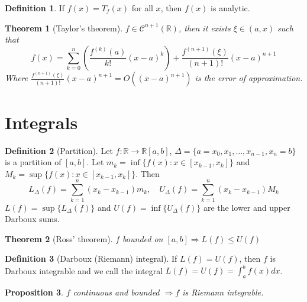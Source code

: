 \documentclass{article}
\newcommand{\Ar}{\Rightarrow}
\newcommand{\fOnR}[1]{#1 : \mathbb{R} \rightarrow \mathbb{R}}
\newcommand{\intcc}[1]{\left[#1\right]}
\newcommand{\intoo}[1]{\left(#1\right)}
\theoremstyle{definition}
\newtheorem{definition}{Definition}[section]
\theoremstyle{definition}
\theoremstyle{plain}
\newtheorem{theorem}{Theorem}[section]
\theoremstyle{plain}
\theoremstyle{plain}
\theoremstyle{plain}
\newtheorem{proposition}[theorem]{Proposition}
\theoremstyle{definition}
\theoremstyle{remark}
\theoremstyle{remark}
\theoremstyle{remark}
\theoremstyle{remark}
\newcommand{\R}{\mathbb{R}}
\newcommand{\C}{\mathcal{C}}
\newcommand{\sumn}{\sum_{k=1}^n}
\begin{document}
\begin{definition}
  If $f(x) = T_f(x)$ for all $x$, then $f(x)$ is analytic.
\end{definition}



\begin{theorem}[Taylor's theorem]
  $f \in \C^{n+1}(\R)$, then it exists $\xi \in \intoo{a,x}$ such that
  \[
  f(x) =
  \sum_{k=0}^n \left( \frac{f^{(k)}(a)}{k!}(x-a)^k \right) +
  \frac{f^{(n+1)}(\xi)}{(n+1)!}(x-a)^{n+1}
  \]
  Where $\frac{f^{(n+1)}(\xi)}{(n+1)!}(x-a)^{n+1} = O((x-a)^{n+1})$ is the error of approximation.
\end{theorem}


\section{Integrals}


\begin{definition}[Partition]
  Let $\fOnR{f}{\intcc{a,b}}$, $\Delta = \{ a = x_0, x_1, \hdots, x_{n-1}, x_n = b \}$ is a partition of $\intcc{a,b}$. Let $m_k = \inf \{ f(x) : x \in \intcc{x_{k-1},x_k} \}$ and $M_k = \sup \{ f(x) : x \in \intcc{x_{k-1},x_k} \}$. Then
  \[
  L_\Delta(f) = \sumn (x_k - x_{k-1})m_k, \quad
  U_\Delta(f) = \sumn (x_k - x_{k-1})M_k
  \]
  $L(f) = \sup \{ L_\Delta(f) \}$ and $U(f) = \inf \{ U_\Delta(f) \}$ are the lower and upper Darboux sums.
\end{definition}




\begin{theorem}[Ross' theorem]
  $f$ bounded on $\intcc{a,b} \Ar L(f) \leq U(f)$
\end{theorem}


\begin{definition}[Darboux (Riemann) integral]
    If $L(f) = U(f)$, then $f$ is Darboux integrable and we call the integral $L(f) = U(f) = \int_a^b f(x) dx$.
\end{definition}


\begin{proposition}
  $f$ continuous and bounded $\Ar f$ is Riemann integrable.
\end{proposition}
\end{document}
